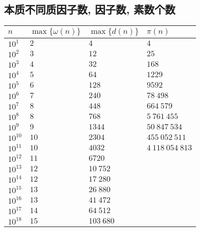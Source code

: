 \subsection{本质不同质因子数, 因子数, 素数个数}

\begin{tabular}{llll}
    \hline
    \(n\)       & \(\max\{\omega(n)\}\) & \(\max\{d(n)\}\) & \(\pi(n)\)        \\
    \hline
    \(10^1\)    & \(2\)                 & \(4\)            & \(4\)             \\
    \(10^2\)    & \(3\)                 & \(12\)           & \(25\)            \\
    \(10^3\)    & \(4\)                 & \(32\)           & \(168\)           \\
    \(10^4\)    & \(5\)                 & \(64\)           & \(1229\)          \\
    \(10^5\)    & \(6\)                 & \(128\)          & \(9592\)          \\
    \(10^6\)    & \(7\)                 & \(240\)          & \(78~498\)        \\
    \(10^7\)    & \(8\)                 & \(448\)          & \(664~579\)       \\
    \(10^8\)    & \(8\)                 & \(768\)          & \(5~761~455\)     \\
    \(10^9\)    & \(9\)                 & \(1344\)         & \(50~847~534\)    \\
    \(10^{10}\) & \(10\)                & \(2304\)         & \(455~052~511\)   \\
    \(10^{11}\) & \(10\)                & \(4032\)         & \(4~118~054~813\) \\
    \(10^{12}\) & \(11\)                & \(6720\)         &                   \\
    \(10^{13}\) & \(12\)                & \(10~752\)       &                   \\
    \(10^{14}\) & \(12\)                & \(17~280\)       &                   \\
    \(10^{15}\) & \(13\)                & \(26~880\)       &                   \\
    \(10^{16}\) & \(13\)                & \(41~472\)       &                   \\
    \(10^{17}\) & \(14\)                & \(64~512\)       &                   \\
    \(10^{18}\) & \(15\)                & \(103~680\)      &                   \\
    \hline
\end{tabular}

